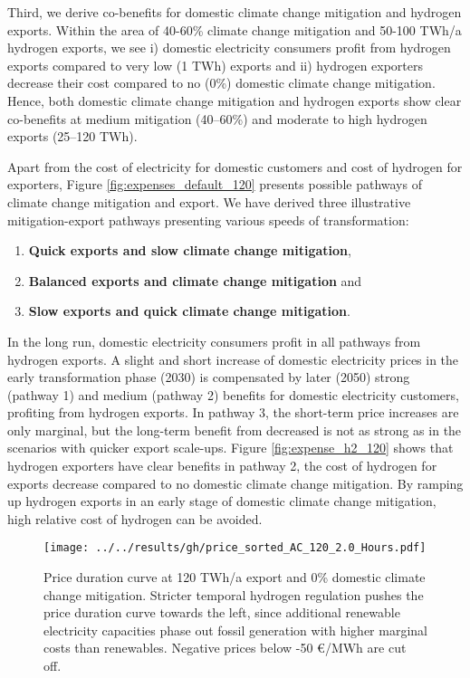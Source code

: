 Third, we derive co-benefits for domestic climate change mitigation and hydrogen exports. 
Within the area of 40-60\% climate change mitigation and 50-100 TWh/a hydrogen exports, we see i) domestic electricity consumers profit from hydrogen exports compared to very low (1 TWh) exports and ii) hydrogen exporters decrease their cost compared to no (0\%) domestic climate change mitigation. Hence, both domestic climate change mitigation and hydrogen exports show clear co-benefits at medium mitigation (40--60\%) and moderate to high hydrogen exports (25--120 TWh). 


Apart from the cost of electricity for domestic customers and cost of hydrogen for exporters, Figure \ref{fig:expenses_default_120} presents possible pathways of climate change mitigation and export. We have derived three illustrative mitigation-export pathways presenting various speeds of transformation:
\begin{enumerate}
    \item \textbf{Quick exports and slow climate change mitigation},
    \item \textbf{Balanced exports and climate change mitigation} and
    \item \textbf{Slow exports and quick climate change mitigation}.
\end{enumerate}

In the long run, domestic electricity consumers profit in all pathways from hydrogen exports. A slight and short increase of domestic electricity prices in the early transformation phase (2030) is compensated by later (2050) strong (pathway 1) and medium (pathway 2) benefits for domestic electricity customers, profiting from hydrogen exports.
In pathway 3, the short-term price increases are only marginal, but the long-term benefit from decreased is not as strong as in the scenarios with quicker export scale-ups. Figure \ref{fig:expense_h2_120} shows that hydrogen exporters have clear benefits in pathway 2, the cost of hydrogen for exports decrease compared to no domestic climate change mitigation. By ramping up hydrogen exports in an early stage of domestic climate change mitigation, high relative cost of hydrogen can be avoided.


\begin{figure}[h!]
    \centering
    \texttt{[image: ../../results/gh/price\_sorted\_AC\_120\_2.0\_Hours.pdf]}
    \caption{Price duration curve at 120 TWh/a export and 0\% domestic climate change mitigation. Stricter temporal hydrogen regulation pushes the price duration curve towards the left, since additional renewable electricity capacities phase out fossil generation with higher marginal costs than renewables. Negative prices below -50 €/MWh are cut off.}
    \label{fig:pdc-120-0}
\end{figure}



